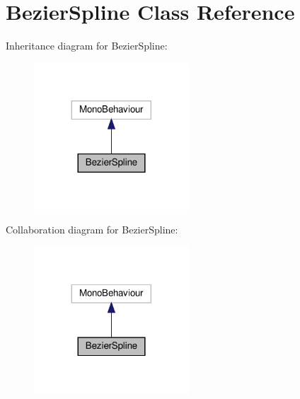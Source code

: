 \hypertarget{classBezierSpline}{}\section{Bezier\+Spline Class Reference}
\label{classBezierSpline}


Inheritance diagram for Bezier\+Spline\+:\nopagebreak
\begin{figure}[H]
\begin{center}
\leavevmode
\includegraphics[width=164pt]{classBezierSpline__inherit__graph}
\end{center}
\end{figure}


Collaboration diagram for Bezier\+Spline\+:\nopagebreak
\begin{figure}[H]
\begin{center}
\leavevmode
\includegraphics[width=164pt]{classBezierSpline__coll__graph}
\end{center}
\end{figure}
